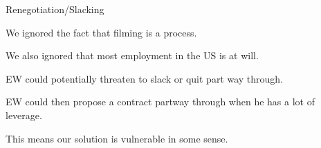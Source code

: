 \documentclass[aspectratio=169,usenames,dvipsnames]{beamer}
\newenvironment{wideitemize}{\itemize\addtolength{\itemsep}{10pt}}{\enditemize}
\begin{document}
\begin{frame}{Renegotiation/Slacking}

\begin{wideitemize}
    \item We ignored the fact that filming is a process.
    \item We also ignored that most employment in the US is at will.
    \item EW could potentially threaten to slack or quit part way through.
    \item EW could then propose a contract partway through when he has a lot of leverage.
    \item This means our solution is vulnerable in some sense.
\end{wideitemize}
    
\end{frame}
\end{document}

